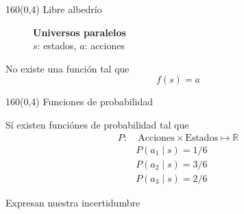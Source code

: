 \documentclass[shownotes,aspectratio=169]{beamer}
\begin{document}
\begin{frame}[plain]
 \begin{textblock}{160}(0,4)
 \centering \LARGE
Libre albedrío
\end{textblock}
\vspace{0.75cm}


 \begin{figure}[H]
\centering
    \caption*{\normalsize \textbf{Universos paralelos} \ \ \ \   \\ $s$: estados, $a$: acciones \ \ \ \  }
\end{figure}

\pause
\vspace{0.3cm}

\centering \Large No existe una funci\'on tal que 
 \begin{equation*}
  f(s)=a
 \end{equation*}

\end{frame}


\begin{frame}[plain]
 \begin{textblock}{160}(0,4)
 \centering \LARGE
Funciones de probabilidad
\end{textblock}
\vspace{1.25cm}


\centering  \normalsize S\'i existen funci\'ones de probabilidad tal que 
 \begin{align*}
 P : & \ \text{Acciones}\times\text{Estados} \mapsto \mathbb{R} \\
    &P(a_1 \mid s)  = 1/6 \\
   &P(a_2 \mid s)  = 3/6 \\
   &P(a_3 \mid s)  = 2/6 
 \end{align*}
 
 \vspace{0.3cm}
 
   \centering Expresan nuestra incertidumbre
 
 
\end{frame}
\end{document}
